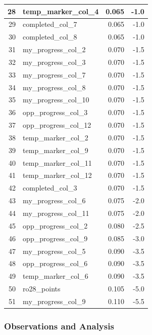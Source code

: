 \documentclass[12pt]{article}
\begin{document}
\begin{thesis}
\begin{longtable}[t]{r|l|r|r}
\hline
28 & temp\_marker\_col\_4 & 0.065 & -1.0\\
\hline
29 & completed\_col\_7 & 0.065 & -1.0\\
\hline
30 & completed\_col\_8 & 0.065 & -1.0\\
\hline
31 & my\_progress\_col\_2 & 0.070 & -1.5\\
\hline
32 & my\_progress\_col\_3 & 0.070 & -1.5\\
\hline
33 & my\_progress\_col\_7 & 0.070 & -1.5\\
\hline
34 & my\_progress\_col\_8 & 0.070 & -1.5\\
\hline
35 & my\_progress\_col\_10 & 0.070 & -1.5\\
\hline
36 & opp\_progress\_col\_3 & 0.070 & -1.5\\
\hline
37 & opp\_progress\_col\_12 & 0.070 & -1.5\\
\hline
38 & temp\_marker\_col\_2 & 0.070 & -1.5\\
\hline
39 & temp\_marker\_col\_9 & 0.070 & -1.5\\
\hline
40 & temp\_marker\_col\_11 & 0.070 & -1.5\\
\hline
41 & temp\_marker\_col\_12 & 0.070 & -1.5\\
\hline
42 & completed\_col\_3 & 0.070 & -1.5\\
\hline
43 & my\_progress\_col\_6 & 0.075 & -2.0\\
\hline
44 & my\_progress\_col\_11 & 0.075 & -2.0\\
\hline
45 & opp\_progress\_col\_2 & 0.080 & -2.5\\
\hline
46 & opp\_progress\_col\_9 & 0.085 & -3.0\\
\hline
47 & my\_progress\_col\_5 & 0.090 & -3.5\\
\hline
48 & opp\_progress\_col\_6 & 0.090 & -3.5\\
\hline
49 & temp\_marker\_col\_6 & 0.090 & -3.5\\
\hline
50 & ro28\_points & 0.105 & -5.0\\
\hline
51 & my\_progress\_col\_9 & 0.110 & -5.5\\
\hline
\end{longtable}
\endgroup{}

\subsubsection{Observations and Analysis}\label{observations-and-analysis-2}


\end{thesis}
\end{document}
